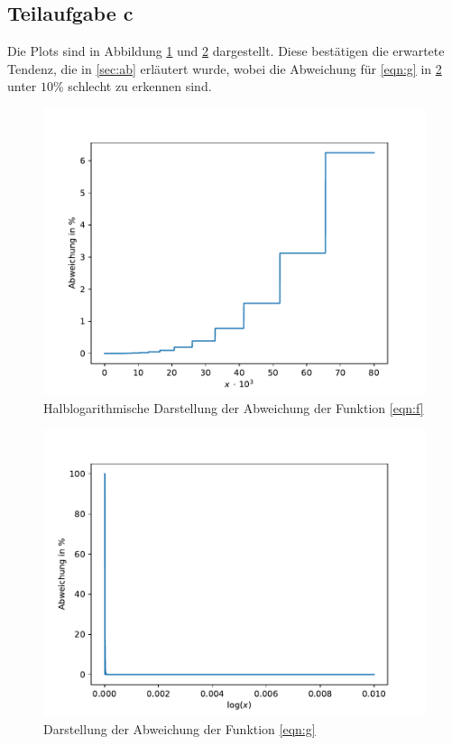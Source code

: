 \subsection{Teilaufgabe c}
Die Plots sind in Abbildung \ref{fig:1a} und \ref{fig:1b} dargestellt. Diese bestätigen die erwartete Tendenz, die in \ref{sec:ab} erläutert wurde, wobei die Abweichung für \eqref{eqn:g} in \ref{fig:1b} unter $10\%$ schlecht zu erkennen sind.
\begin{figure}[H]
  \centering
  \includegraphics[width=\textwidth]{Aufgabe01/Fehler1a.pdf}
  \caption{Halblogarithmische Darstellung der Abweichung der Funktion \eqref{eqn:f}}
  \label{fig:1a}
\end{figure}

\begin{figure}[H]
  \centering
  \includegraphics[width=\textwidth]{Aufgabe01/Fehler1b.pdf}
  \caption{Darstellung der Abweichung der Funktion \eqref{eqn:g}}
  \label{fig:1b}
\end{figure}
